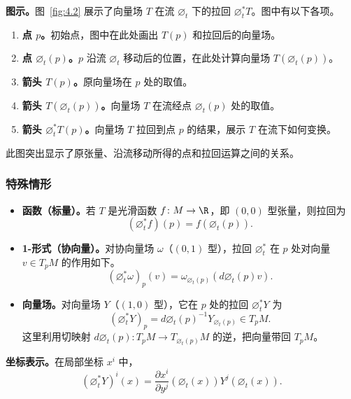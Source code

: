 \textbf{图示。}图~\ref{fig:4.2} 展示了向量场 $T$ 在流 $\varnothing_t$ 下的拉回 $\varnothing_t^*T$。图中有以下各项。
\begin{figure}[!htb]
  \centering
  
\end{figure}

\begin{enumerate}
  \item \textbf{点 $p$。}初始点，图中在此处画出 $T(p)$ 和拉回后的向量场。
  \item \textbf{点 $\varnothing_t(p)$。}$p$ 沿流 $\varnothing_t$ 移动后的位置，在此处计算向量场 $T(\varnothing_t(p))$。
  \item \textbf{箭头 $T(p)$。}原向量场在 $p$ 处的取值。
  \item \textbf{箭头 $T(\varnothing_t(p))$。}向量场 $T$ 在流经点 $\varnothing_t(p)$ 处的取值。
  \item \textbf{箭头 $\varnothing_t^*T(p)$。}向量场 $T$ 拉回到点 $p$ 的结果，展示 $T$ 在流下如何变换。
\end{enumerate}
此图突出显示了原张量、沿流移动所得的点和拉回运算之间的关系。

\subsubsection{特殊情形}
\begin{itemize}
  \item \textbf{函数（标量）。}若 $T$ 是光滑函数 $f\colon M\to\R$，即 $(0,0)$ 型张量，则拉回为
  \[
    (\varnothing_t^*f)(p)=f(\varnothing_t(p)).
  \]
  \item \textbf{1-形式（协向量）。}对协向量场 $\omega$（$(0,1)$ 型），拉回 $\varnothing_t^*$ 在 $p$ 处对向量 $v\in T_pM$ 的作用如下。
  \[
    (\varnothing_t^*\omega)_p(v)
       =\omega_{\varnothing_t(p)}(d\varnothing_t(p)v).
  \]
  \item \textbf{向量场。}对向量场 $Y$（$(1,0)$ 型），它在 $p$ 处的拉回 $\varnothing_t^*Y$ 为
  \[
    (\varnothing_t^*Y)_p=d\varnothing_t(p)^{-1}Y_{\varnothing_t(p)}\in T_pM.
  \]
  这里利用切映射 $d\varnothing_t(p)\colon T_pM\to T_{\varnothing_t(p)}M$ 的逆，把向量带回 $T_pM$。
\end{itemize}

\textbf{坐标表示。}在局部坐标 $x^i$ 中，
\[
  (\varnothing_t^*Y)^i(x)=
    \frac{\partial x^i}{\partial y^j}(\varnothing_t(x))Y^j(\varnothing_t(x)).
\]

